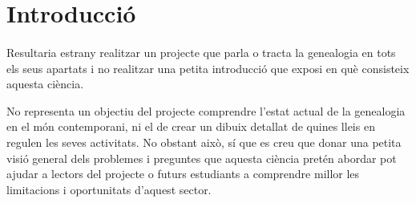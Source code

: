 \section{Introducció}

    \paragraph{}
    Resultaria estrany realitzar un projecte que parla o tracta la genealogia en tots els seus apartats i no realitzar una petita introducció que exposi en què consisteix aquesta ciència.

    No representa un objectiu del projecte comprendre l’estat actual de la genealogia en el món contemporani, ni el de crear un dibuix detallat de quines lleis en regulen les seves activitats. No obstant això, sí que es creu que donar una petita visió general dels problemes i preguntes que aquesta ciència pretén abordar pot ajudar a lectors del projecte o futurs estudiants a comprendre millor les  limitacions i oportunitats d'aquest sector.
